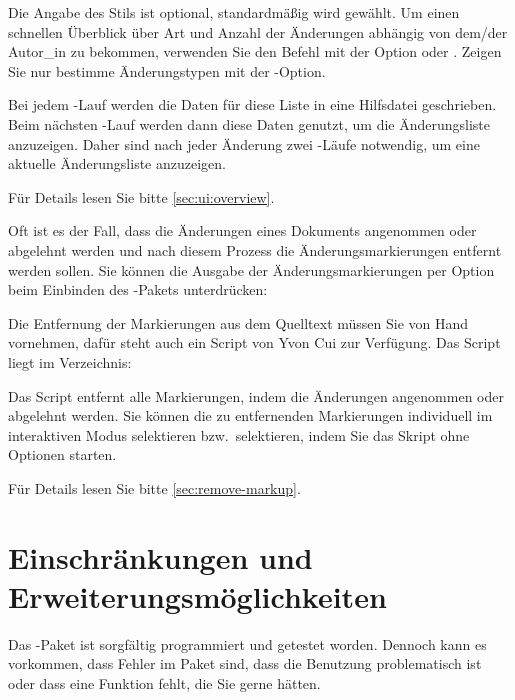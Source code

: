Die Angabe des Stils ist optional, standardmäßig wird  gewählt.
Um einen schnellen Überblick über Art und Anzahl der Änderungen abhängig von dem/der Autor\_in zu bekommen, verwenden Sie den Befehl mit der Option  oder .
Zeigen Sie nur bestimme Änderungstypen mit der -Option.

Bei jedem -Lauf werden die Daten für diese Liste in eine Hilfsdatei geschrieben.
Beim nächsten -Lauf werden dann diese Daten genutzt, um die Änderungsliste anzuzeigen.
Daher sind nach jeder Änderung zwei -Läufe notwendig, um eine aktuelle Änderungsliste anzuzeigen.

Für Details lesen Sie bitte \autoref{sec:ui:overview}.


Oft ist es der Fall, dass die Änderungen eines Dokuments angenommen oder abgelehnt werden und nach diesem Prozess die Änderungsmarkierungen entfernt werden sollen.
Sie können die Ausgabe der Änderungsmarkierungen per Option beim Einbinden des -Pakets unterdrücken:


Die Entfernung der Markierungen aus dem Quelltext müssen Sie von Hand vornehmen, dafür steht auch ein Script von Yvon Cui zur Verfügung.
Das Script liegt im Verzeichnis:


Das Script entfernt alle Markierungen, indem die Änderungen angenommen oder abgelehnt werden.
Sie können die zu entfernenden Markierungen individuell im interaktiven Modus selektieren bzw.\ selektieren, indem Sie das Skript ohne Optionen starten.

Für Details lesen Sie bitte \autoref{sec:remove-markup}.



\cleardoublepage
\section{Einschränkungen und Erweiterungsmöglichkeiten}
\label{sec:limitations}

Das -Paket ist sorgfältig programmiert und getestet worden.
Dennoch kann es vorkommen, dass Fehler im Paket sind, dass die Benutzung problematisch ist oder dass eine Funktion fehlt, die Sie gerne hätten.


